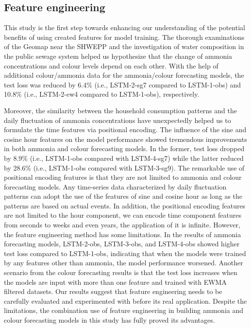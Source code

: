 
\subsection{Feature engineering}
This study is the first step towards enhancing our understanding of the potential benefits of using created features for model training. The thorough examinations of the Geomap near the SHWEPP and the investigation of water composition in the public sewage system helped us hypothesize that the change of ammonia concentrations and colour levels depend on each other. With the help of additional colour/ammonia data for the ammonia/colour forecasting models, the test loss was reduced by 6.4\% (i.e., LSTM-2-sg7 compared to LSTM-1-obs) and 10.8\% (i.e., LSTM-2-ew4 compared to LSTM-1-obs), respectively. 

Moreover, the similarity between the household consumption patterns and the daily fluctuation of ammonia concentrations have unexpectedly helped us to formulate the time features via positional encoding. The influence of the sine and cosine hour features on the model performance showed tremendous improvements in both ammonia and colour forecasting models. In the former, test loss dropped by 8.9\% (i.e., LSTM-1-obs compared with LSTM-4-sg7) while the latter reduced by 28.6\% (i.e., LSTM-1-obs compared with LSTM-3-sg9). The remarkable use of positional encoding features is that they are not limited to ammonia and colour forecasting models. Any time-series data characterized by daily fluctuation patterns can adopt the use of the features of sine and cosine hour as long as the patterns are based on actual events. In addition, the positional encoding features are not limited to the hour component, we can encode time component features from seconds to weeks and even years, the application of it is infinite. However, the feature engineering method has some limitations. In the results of ammonia forecasting models, LSTM-2-obs, LSTM-3-obs, and LSTM-4-obs showed higher test loss compared to LSTM-1-obs, indicating that when the models were trained by any features other than ammonia, the model performance worsened. Another scenario from the colour forecasting results is that the test loss increases when the models are input with more than one feature and trained with EWMA filtered datasets. Our results suggest that feature engineering needs to be carefully evaluated and experimented with before its real application. Despite the limitations, the combination use of feature engineering in building ammonia and colour forecasting models in this study has fully proved its advantages. 

